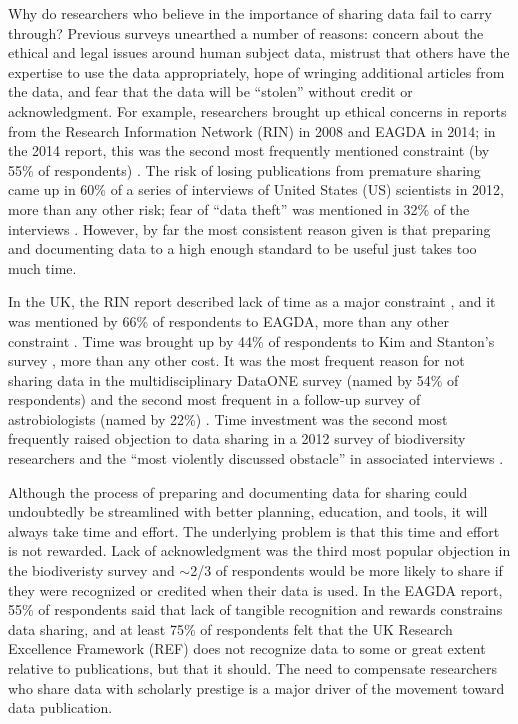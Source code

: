 \documentclass[10pt]{article}
\begin{document}
Why do researchers who believe in the importance of sharing data fail to carry through?
Previous surveys unearthed a number of reasons: concern about the ethical and legal issues around human subject data, mistrust that others have the expertise to use the data appropriately, hope of wringing additional articles from the data, and fear that the data will be ``stolen'' without credit or acknowledgment.
For example, researchers brought up ethical concerns in reports from the Research Information Network (RIN) in 2008 and EAGDA in 2014; in the 2014 report, this was the second most frequently mentioned constraint (by 55\% of respondents) \cite{swan_share_2008, bobrow_establishing_2014}.
The risk of losing publications from premature sharing came up in 60\% of a series of interviews of United States (US) scientists in 2012, more than any other risk; fear of ``data theft'' was mentioned in 32\% of the interviews \cite{kim_institutional_2012}.
However, by far the most consistent reason given is that preparing and documenting data to a high enough standard to be useful just takes too much time.

In the UK, the RIN report described lack of time as a major constraint \cite{swan_share_2008}, and it was mentioned by 66\% of respondents to EAGDA, more than any other constraint \cite{bobrow_establishing_2014}.
Time was brought up by 44\% of respondents to Kim and Stanton's survey \cite{kim_institutional_2012}, more than any other cost.
It was the most frequent reason for not sharing data in the multidisciplinary DataONE survey (named by 54\% of respondents) \cite{tenopir_data_2011} and the second most frequent in a follow-up survey of astrobiologists (named by 22\%) \cite{aydinoglu_data_2014}.
Time investment was the second most frequently raised objection to data sharing in a 2012 survey of biodiversity researchers and the ``most violently discussed obstacle'' in associated interviews \cite{enke_users_2012}.

Although the process of preparing and documenting data for sharing could undoubtedly be streamlined with better planning, education, and tools, it will always take time and effort.
The underlying problem is that this time and effort is not rewarded.
Lack of acknowledgment was the third most popular objection in the biodiveristy survey and $\sim$2/3 of respondents would be more likely to share if they were recognized or credited when their data is used.
In the EAGDA report, 55\% of respondents said that lack of tangible recognition and rewards constrains data sharing, and at least 75\% of respondents felt that the UK Research Excellence Framework (REF) does not recognize data to some or great extent relative to publications, but that it should.
The need to compensate researchers who share data with scholarly prestige is a major driver of the movement toward data publication.
 
\end{document}
